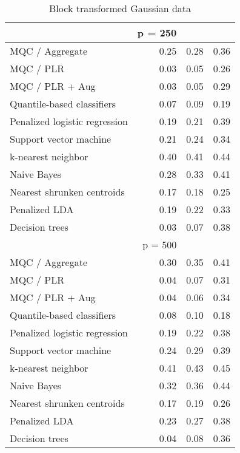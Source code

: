 \begin{table}[p]
\begin{minipage}{0.49\textwidth}
{\begin{tabular}{lrrr}
        \hline
        & p = 250 \\
        \hline

        MQC / Aggregate & 0.25 & 0.28 & 0.36 \\ 
        MQC / PLR & 0.03 & 0.05 & 0.26 \\ 
        MQC / PLR + Aug & 0.03 & 0.05 & 0.29 \\ 
        Quantile-based classifiers & 0.07 & 0.09 & 0.19 \\ 
        Penalized logistic regression & 0.19 & 0.21 & 0.39 \\ 
        Support vector machine & 0.21 & 0.24 & 0.34 \\ 
        k-nearest neighbor & 0.40 & 0.41 & 0.44 \\ 
        Naive Bayes & 0.28 & 0.33 & 0.41 \\ 
        Nearest shrunken centroids & 0.17 & 0.18 & 0.25 \\ 
        Penalized LDA & 0.19 & 0.22 & 0.33 \\ 
        Decision trees & 0.03 & 0.07 & 0.38 \\[2ex]

        \hline
        & p = 500 \\
        \hline

        MQC / Aggregate & 0.30 & 0.35 & 0.41 \\ 
        MQC / PLR & 0.04 & 0.07 & 0.31 \\ 
        MQC / PLR + Aug & 0.04 & 0.06 & 0.34 \\ 
        Quantile-based classifiers & 0.08 & 0.10 & 0.18 \\ 
        Penalized logistic regression & 0.19 & 0.22 & 0.38 \\ 
        Support vector machine & 0.24 & 0.29 & 0.39 \\ 
        k-nearest neighbor & 0.41 & 0.43 & 0.45 \\ 
        Naive Bayes & 0.32 & 0.36 & 0.44 \\ 
        Nearest shrunken centroids & 0.17 & 0.19 & 0.26 \\ 
        Penalized LDA & 0.23 & 0.27 & 0.38 \\ 
        Decision trees & 0.04 & 0.08 & 0.36 \\ 
        \hline
      \end{tabular}
    }
  \end{minipage}

  \caption{Block transformed Gaussian data}
  \label{tab:block-gaussian}
\end{table}




